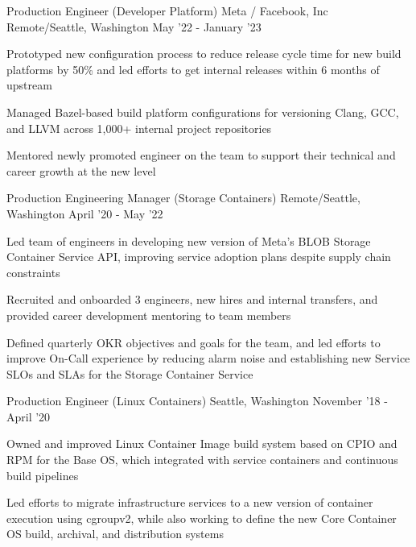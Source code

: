 \begin{cventries}
\cventry
	{Production Engineer \color{solarized-orange}(Developer Platform)} %
	{Meta / Facebook, Inc} %
    {Remote/Seattle, Washington} %
    {May '22 - January '23} %
    {
        \begin{cvitems}
		  \item Prototyped new configuration process to reduce release cycle time for new build platforms by 50\% and led efforts to get internal releases within 6 months of upstream
		  \item Managed Bazel-based build platform configurations for versioning Clang, GCC, and LLVM across 1,000+ internal project repositories
		  \item Mentored newly promoted engineer on the team to support their technical and career growth at the new level
        \end{cvitems}
    }
\vspace{0mm}
\cventry
	{Production Engineering Manager \color{solarized-orange}(Storage Containers)} %
    {} %
    {Remote/Seattle, Washington} %
    {April '20 - May '22} %
    {
        \begin{cvitems}
		\item Led team of engineers in developing new version of Meta's BLOB Storage Container Service API, improving service adoption plans despite supply chain constraints
		\item Recruited and onboarded 3 engineers, new hires and internal transfers, and provided career development mentoring to team members
		\item Defined quarterly OKR objectives and goals for the team, and led efforts to improve On-Call experience by reducing alarm noise and establishing new Service SLOs and SLAs for the Storage Container Service
        \end{cvitems}
    }
\vspace{2mm}
\cventry
	{Production Engineer \color{solarized-orange}(Linux Containers)} %
    {} %
    {Seattle, Washington} %
    {November '18 - April '20} %
    {
        \begin{cvitems}
		  \item Owned and improved Linux Container Image build system based on CPIO and RPM for the Base OS, which integrated with service containers and continuous build pipelines
		  \item Led efforts to migrate infrastructure services to a new version of container execution using cgroupv2, while also working to define the new Core Container OS build, archival, and distribution systems

\end{cvitems}}
\end{cventries}
